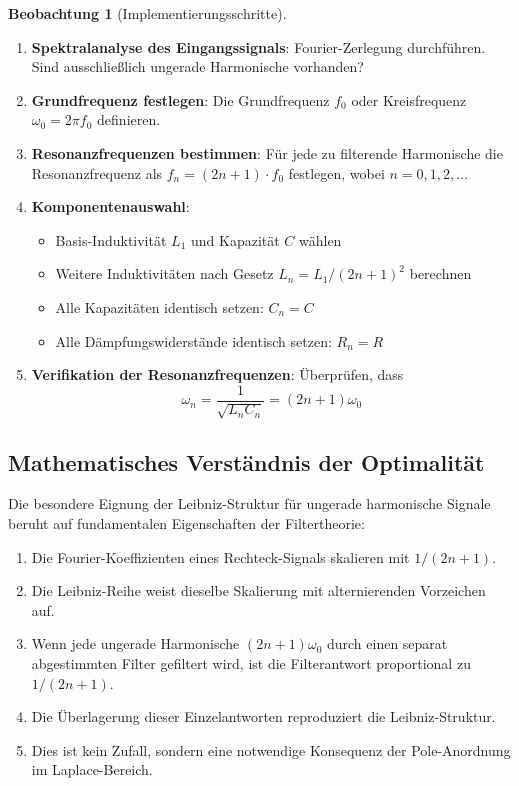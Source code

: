 \documentclass[a4paper,12pt,twoside]{report}
\theoremstyle{definition}
\newtheorem{beobachtung}{Beobachtung}
\begin{document}
\begin{beobachtung}[Implementierungsschritte]
\begin{enumerate}
	\item \textbf{Spektralanalyse des Eingangssignals}: Fourier-Zerlegung durchführen. Sind ausschließlich ungerade Harmonische vorhanden?
	
	\item \textbf{Grundfrequenz festlegen}: Die Grundfrequenz $f_0$ oder Kreisfrequenz $\omega_0 = 2\pi f_0$ definieren.
	
	\item \textbf{Resonanzfrequenzen bestimmen}: Für jede zu filterende Harmonische die Resonanzfrequenz als $f_n = (2n+1) \cdot f_0$ festlegen, wobei $n = 0, 1, 2, \ldots$
	
	\item \textbf{Komponentenauswahl}:
	\begin{itemize}
		\item Basis-Induktivität $L_1$ und Kapazität $C$ wählen
		\item Weitere Induktivitäten nach Gesetz $L_n = L_1 / (2n+1)^2$ berechnen
		\item Alle Kapazitäten identisch setzen: $C_n = C$
		\item Alle Dämpfungswiderstände identisch setzen: $R_n = R$
	\end{itemize}
	
	\item \textbf{Verifikation der Resonanzfrequenzen}: Überprüfen, dass 
	$$\omega_n = \frac{1}{\sqrt{L_n C_n}} = (2n+1) \omega_0$$
\end{enumerate}
\end{beobachtung}

\subsection{Mathematisches Verständnis der Optimalität}

Die besondere Eignung der Leibniz-Struktur für ungerade harmonische Signale beruht auf fundamentalen Eigenschaften der Filtertheorie:

\begin{enumerate}
	\item Die Fourier-Koeffizienten eines Rechteck-Signals skalieren mit $1/(2n+1)$.
	
	\item Die Leibniz-Reihe weist dieselbe Skalierung mit alternierenden Vorzeichen auf.
	
	\item Wenn jede ungerade Harmonische $(2n+1)\omega_0$ durch einen separat abgestimmten Filter gefiltert wird, ist die Filterantwort proportional zu $1/(2n+1)$.
	
	\item Die Überlagerung dieser Einzelantworten reproduziert die Leibniz-Struktur.
	
	\item Dies ist kein Zufall, sondern eine notwendige Konsequenz der Pole-Anordnung im Laplace-Bereich.
\end{enumerate}
\end{document}
